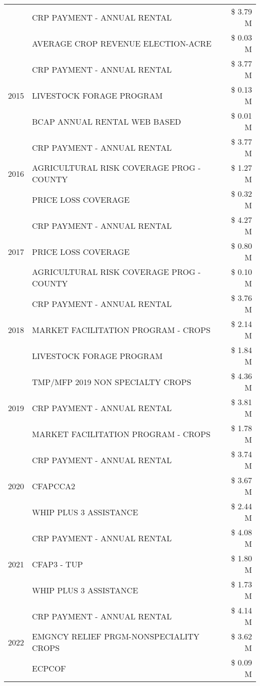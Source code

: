 \begin{tabular}{llr}
 & CRP PAYMENT - ANNUAL RENTAL & \$ 3.79 M \\
 & AVERAGE CROP REVENUE ELECTION-ACRE & \$ 0.03 M \\
\cline{1-3}
\multirow[t]{3}{*}{2015} & CRP PAYMENT - ANNUAL RENTAL & \$ 3.77 M \\
 & LIVESTOCK FORAGE PROGRAM & \$ 0.13 M \\
 & BCAP ANNUAL RENTAL WEB BASED & \$ 0.01 M \\
\cline{1-3}
\multirow[t]{3}{*}{2016} & CRP PAYMENT - ANNUAL RENTAL & \$ 3.77 M \\
 & AGRICULTURAL RISK COVERAGE PROG - COUNTY & \$ 1.27 M \\
 & PRICE LOSS COVERAGE & \$ 0.32 M \\
\cline{1-3}
\multirow[t]{3}{*}{2017} & CRP PAYMENT - ANNUAL RENTAL & \$ 4.27 M \\
 & PRICE LOSS COVERAGE & \$ 0.80 M \\
 & AGRICULTURAL RISK COVERAGE PROG - COUNTY & \$ 0.10 M \\
\cline{1-3}
\multirow[t]{3}{*}{2018} & CRP PAYMENT - ANNUAL RENTAL & \$ 3.76 M \\
 & MARKET FACILITATION PROGRAM - CROPS & \$ 2.14 M \\
 & LIVESTOCK FORAGE PROGRAM & \$ 1.84 M \\
\cline{1-3}
\multirow[t]{3}{*}{2019} & TMP/MFP 2019 NON SPECIALTY CROPS & \$ 4.36 M \\
 & CRP PAYMENT - ANNUAL RENTAL & \$ 3.81 M \\
 & MARKET FACILITATION PROGRAM - CROPS & \$ 1.78 M \\
\cline{1-3}
\multirow[t]{3}{*}{2020} & CRP PAYMENT - ANNUAL RENTAL & \$ 3.74 M \\
 & CFAPCCA2 & \$ 3.67 M \\
 & WHIP PLUS 3 ASSISTANCE & \$ 2.44 M \\
\cline{1-3}
\multirow[t]{3}{*}{2021} & CRP PAYMENT - ANNUAL RENTAL & \$ 4.08 M \\
 & CFAP3 - TUP & \$ 1.80 M \\
 & WHIP PLUS 3 ASSISTANCE & \$ 1.73 M \\
\cline{1-3}
\multirow[t]{3}{*}{2022} & CRP PAYMENT - ANNUAL RENTAL & \$ 4.14 M \\
 & EMGNCY RELIEF PRGM-NONSPECIALITY CROPS & \$ 3.62 M \\
 & ECPCOF & \$ 0.09 M \\
\cline{1-3}
\bottomrule
\end{tabular}

